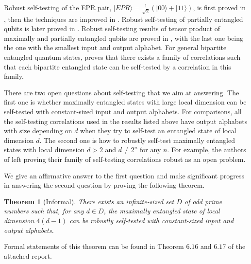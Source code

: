 \documentclass[11pt,letterpaper]{article}
\newcommand{\ket}[1]{|#1\rangle}
\newcommand{\1}{\mathbb{1}}
\newtheorem{theorem}{Theorem}
\theoremstyle{definition}
\begin{document}
Robust self-testing of the EPR pair, 
$\ket{EPR} = \frac{1}{\sqrt{2}}(\ket{00}+\ket{11})$,
is first proved in \cite{mckague2012}, then 
the techniques are improved in \cite{bamps2015}.
Robust self-testing of partially entangled qubits is later proved in
\cite{yang2013}.
Robust self-testing results of tensor product of maximally and partially entangled qubits 
are proved in \cite{coladan2016parallel,natarajan2017,lowdegree},
with the last one being the one with the smallest input and output alphabet.
For general bipartite entangled quantum states, \cite{coladan2017all} proves that there exists a family of correlations such that
each bipartite entangled state can be self-tested by a correlation in this family.


There are two open questions about self-testing that we aim at answering.
The first one is whether maximally entangled states with large local dimension
can be self-tested with constant-sized input and output alphabets. 
For comparisons,
all the self-testing correlations used in the results listed above have 
output alphabets with size depending on $d$
when they try to self-test an entangled state of local dimension $d$.
The second one is how to robustly self-test maximally entangled states
with local dimension $d > 2$ and $d \neq 2^n$ for any $n$.
For example, the authors of \cite{coladan2017all} left proving their
family of self-testing correlations robust as an open problem.

We give an affirmative answer to the first question
and make significant progress in answering the 
second question
by proving the following theorem.  
\begin{theorem}[Informal]
\label{thm:inf}
	There exists an infinite-sized set $D$ of odd prime numbers such that, for any $d \in D$, 
	the maximally entangled state of local dimension $4(d-1)$ can be robustly self-tested 
	with constant-sized input and output alphabets.
\end{theorem}
Formal statements of this theorem can be found in Theorem $6.16$ and $6.17$
of the attached report.
\end{document}
